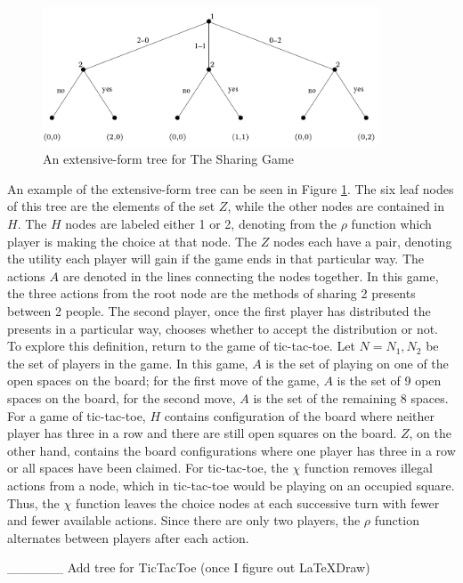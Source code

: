\begin{figure}[h]
  \centering
  \includegraphics[width=10cm]{figures/ExampleTree.png}
  \caption{An extensive-form tree for The Sharing Game}
  \label{fig:sharingTree}
\end{figure}

An example of the extensive-form tree can be seen in Figure \ref{fig:sharingTree}. The six leaf nodes of this tree are the elements of the set $Z$, while the other nodes are contained in $H$. The $H$ nodes are labeled either 1 or 2, denoting from the $\rho$ function which player is making the choice at that node. The $Z$ nodes each have a pair, denoting the utility each player will gain if the game ends in that particular way. The actions $A$ are denoted in the lines connecting the nodes together. In this game, the three actions from the root node are the methods of sharing 2 presents between 2 people. The second player, once the first player has distributed the presents in a particular way, chooses whether to accept the distribution or not.\\

To explore this definition, return to the game of tic-tac-toe. Let $N={N_1, N_2}$ be the set of players in the game. In this game, $A$ is the set of playing on one of the open spaces on the board; for the first move of the game, $A$ is the set of 9 open spaces on the board, for the second move, $A$ is the set of the remaining 8 spaces. For a game of tic-tac-toe, $H$ contains configuration of the board where neither player has three in a row and there are still open squares on the board. $Z$, on the other hand, contains the board configurations where one player has three in a row or all spaces have been claimed. For tic-tac-toe, the $\chi$ function removes illegal actions from a node, which in tic-tac-toe would be playing on an occupied square. Thus, the $\chi$ function leaves the choice nodes at each successive turn with fewer and fewer available actions. Since there are only two players, the $\rho$ function alternates between players after each action.

\_\_\_\_\_\_ Add tree for TicTacToe (once I figure out LaTeXDraw)

